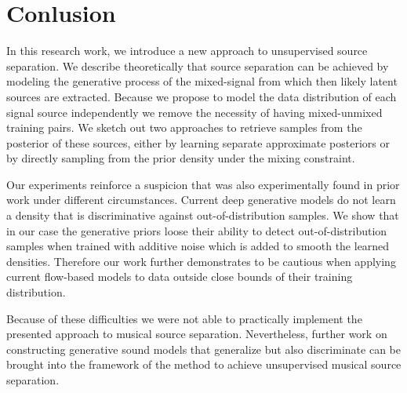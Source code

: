 \chapter{Conlusion}
In this research work, we introduce a new approach to unsupervised source separation. We describe theoretically that source separation can be achieved by modeling the generative process of the mixed-signal from which then likely latent sources are extracted. Because we propose to model the data distribution of each signal source independently we remove the necessity of having mixed-unmixed training pairs. We sketch out two approaches to retrieve samples from the posterior of these sources, either by learning separate approximate posteriors or by directly sampling from the prior density under the mixing constraint.

Our experiments reinforce a suspicion that was also experimentally found in prior work under different circumstances. Current deep generative models do not learn a density that is discriminative against out-of-distribution samples. We show that in our case the generative priors loose their ability to detect out-of-distribution samples when trained with additive noise which is added to smooth the learned densities. Therefore our work further demonstrates to be cautious when applying current flow-based models to data outside close bounds of their training distribution.

Because of these difficulties we were not able to practically implement the presented approach to musical source separation. Nevertheless, further work on constructing generative sound models that generalize but also discriminate can be brought into the framework of the method to achieve unsupervised musical source separation.
